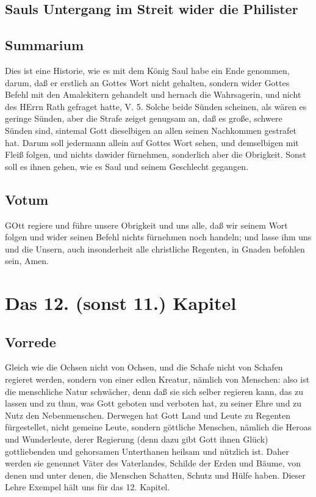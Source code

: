 \section[Sauls Untergang im Streit wider die Philister]{Sauls Untergang im Streit wider die Philister}

\section{Summarium}

Dies ist eine Historie, wie es mit dem König Saul habe ein Ende genommen, darum, daß er erstlich an Gottes Wort nicht gehalten, sondern wider Gottes Befehl mit den Amalekitern gehandelt und hernach die Wahrsagerin, und nicht des HErrn Rath gefraget hatte, V. 5. Solche beide Sünden scheinen, als wären es geringe Sünden, aber die Strafe zeiget genugsam an, daß es große, schwere Sünden sind, sintemal Gott dieselbigen an allen seinen Nachkommen gestrafet hat. Darum soll jedermann allein auf Gottes Wort sehen, und demselbigen mit Fleiß folgen, und nichts dawider fürnehmen, sonderlich aber die Obrigkeit. Sonst soll es ihnen gehen, wie es Saul und seinem Geschlecht gegangen.

\section{Votum}

GOtt regiere und führe unsere Obrigkeit und uns alle, daß wir seinem Wort folgen und wider seinen Befehl nichts fürnehmen noch handeln; und lasse ihm uns und die Unsern, auch insonderheit alle christliche Regenten, in Gnaden befohlen sein, Amen.

\chapter{Das 12. (sonst 11.) Kapitel}

\section{Vorrede}

Gleich wie die Ochsen nicht von Ochsen, und die Schafe nicht von Schafen regieret werden, sondern von einer edlen Kreatur, nämlich von Menschen: also ist die menschliche Natur schwächer, denn daß sie sich selber regieren kann, das zu lassen und zu thun, was Gott geboten und verboten hat, zu seiner Ehre und zu Nutz den Nebenmenschen. Derwegen hat Gott Land und Leute zu Regenten fürgestellet, nicht gemeine Leute, sondern göttliche Menschen, nämlich die Heroas und Wunderleute, derer Regierung (denn dazu gibt Gott ihnen Glück) gottliebenden und gehorsamen Unterthanen heilsam und nützlich ist. Daher werden sie genennet Väter des Vaterlandes, Schilde der Erden und Bäume, von denen und unter denen, die Menschen Schatten, Schutz und Hülfe haben. Dieser Lehre Exempel hält uns für das 12. Kapitel.


